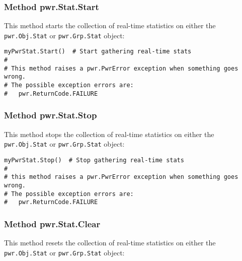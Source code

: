 \documentclass[12pt]{report} %
\begin{document}
\begin{appendices}
\subsubsection{Method pwr.Stat.Start} \label{meth:StatStart}

This method starts the collection of real-time statistics on either the
\texttt{pwr.Obj.Stat} or \texttt{pwr.Grp.Stat} object:

\begin{center}\begin{minipage}{.95\linewidth}\begin{lstlisting}
myPwrStat.Start()  # Start gathering real-time stats
#
# This method raises a pwr.PwrError exception when something goes wrong.
# The possible exception errors are:
#   pwr.ReturnCode.FAILURE
\end{lstlisting}\end{minipage}\end{center}

\subsubsection{Method pwr.Stat.Stop} \label{meth:StatStop}

This method stops the collection of real-time statistics on either the
\texttt{pwr.Obj.Stat} or \texttt{pwr.Grp.Stat} object:

\begin{center}\begin{minipage}{.95\linewidth}\begin{lstlisting}
myPwrStat.Stop()  # Stop gathering real-time stats
#
# this method raises a pwr.PwrError exception when something goes wrong.
# The possible exception errors are:
#   pwr.ReturnCode.FAILURE
\end{lstlisting}\end{minipage}\end{center}

\subsubsection{Method pwr.Stat.Clear} \label{meth:StatClear}

This method resets the collection of real-time statistics on either the
\texttt{pwr.Obj.Stat} or \texttt{pwr.Grp.Stat} object:


\end{appendices}
\end{document}
